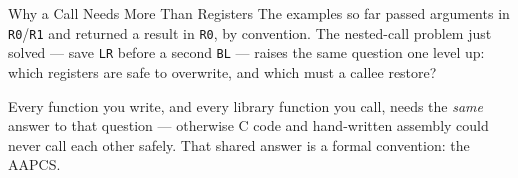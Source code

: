 \documentclass[9pt,aspectratio=169,xcolor=table]{beamer}
\begin{document}
%
%
%
%
%
%
%
%
%

\begin{frame}{Why a Call Needs More Than Registers}
    \leavevmode
    {\small The examples so far passed arguments in \texttt{R0}/\texttt{R1} and
    returned a result in \texttt{R0}, by convention. The nested-call problem
    just solved --- save \texttt{LR} before a second \texttt{BL} --- raises the
    same question one level up: \alert{which} registers are safe to overwrite,
    and which must a callee restore?}

    \vspace{2mm}
    {\small Every function you write, and every library function you call,
    needs the \emph{same} answer to that question --- otherwise C code and
    hand-written assembly could never call each other safely. That shared
    answer is a formal convention: the \alert{AAPCS}.}
\end{frame}
\end{document}
